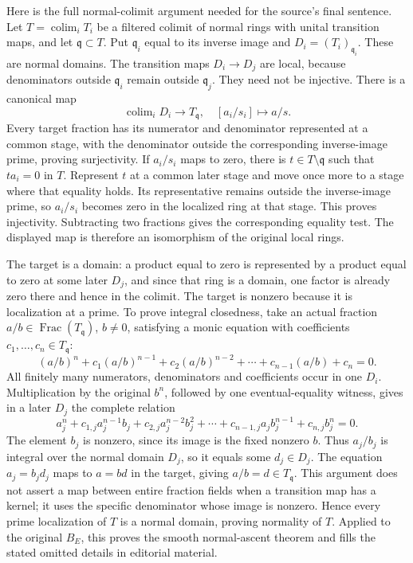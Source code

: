 Here is the full normal-colimit argument needed for the source's final sentence. Let \(T=\operatorname{colim}_i T_i\) be a filtered colimit of normal rings with unital transition maps, and let \(\mathfrak q\subset T\). Put \(\mathfrak q_i\) equal to its inverse image and \(D_i=(T_i)_{\mathfrak q_i}\). These are normal domains. The transition maps \(D_i\to D_j\) are local, because denominators outside \(\mathfrak q_i\) remain outside \(\mathfrak q_j\). They need not be injective. There is a canonical map \[
 \operatorname{colim}_iD_i\longrightarrow T_{\mathfrak q},
 \quad [a_i/s_i]\longmapsto a/s.
\] Every target fraction has its numerator and denominator represented at a common stage, with the denominator outside the corresponding inverse-image prime, proving surjectivity. If \(a_i/s_i\) maps to zero, there is \(t\in T\setminus\mathfrak q\) such that \(ta_i=0\) in \(T\). Represent \(t\) at a common later stage and move once more to a stage where that equality holds. Its representative remains outside the inverse-image prime, so \(a_i/s_i\) becomes zero in the localized ring at that stage. This proves injectivity. Subtracting two fractions gives the corresponding equality test. The displayed map is therefore an isomorphism of the original local rings.

The target is a domain: a product equal to zero is represented by a product equal to zero at some later \(D_j\), and since that ring is a domain, one factor is already zero there and hence in the colimit. The target is nonzero because it is localization at a prime. To prove integral closedness, take an actual fraction \(a/b\in\operatorname{Frac}(T_{\mathfrak q})\), \(b\ne0\), satisfying a monic equation with coefficients \(c_1,\ldots,c_n\in T_{\mathfrak q}\): \[
 (a/b)^n+c_1(a/b)^{n-1}+c_2(a/b)^{n-2}
 +\cdots+c_{n-1}(a/b)+c_n=0.
\] All finitely many numerators, denominators and coefficients occur in one \(D_i\). Multiplication by the original \(b^n\), followed by one eventual-equality witness, gives in a later \(D_j\) the complete relation \[
 a_j^n+c_{1,j}a_j^{n-1}b_j+c_{2,j}a_j^{n-2}b_j^2
 +\cdots+c_{n-1,j}a_jb_j^{n-1}+c_{n,j}b_j^n=0.
\] The element \(b_j\) is nonzero, since its image is the fixed nonzero \(b\). Thus \(a_j/b_j\) is integral over the normal domain \(D_j\), so it equals some \(d_j\in D_j\). The equation \(a_j=b_jd_j\) maps to \(a=bd\) in the target, giving \(a/b=d\in T_{\mathfrak q}\). This argument does not assert a map between entire fraction fields when a transition map has a kernel; it uses the specific denominator whose image is nonzero. Hence every prime localization of \(T\) is a normal domain, proving normality of \(T\). Applied to the original \(B_E\), this proves the smooth normal-ascent theorem and fills the stated omitted details in editorial material.

